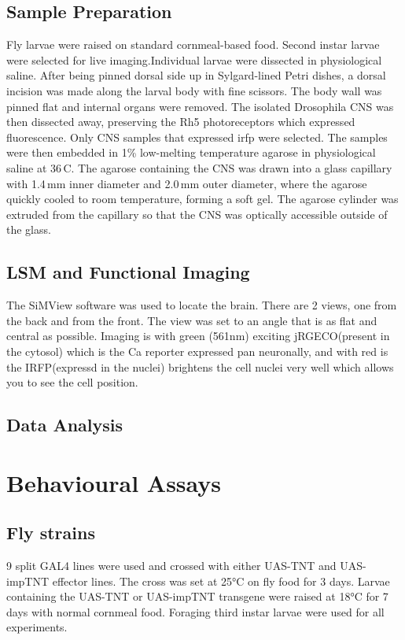 \subsection{Sample Preparation}
Fly larvae were raised on standard cornmeal-based food.
Second instar larvae were selected for live imaging.Individual larvae were dissected in physiological saline.
After being pinned dorsal side up in Sylgard-lined Petri dishes, a dorsal incision was made along the larval body with fine scissors. The body wall was pinned flat and internal organs were removed. The isolated Drosophila CNS was then dissected away, preserving the Rh5 photoreceptors which expressed fluorescence.  Only CNS samples that expressed irfp were selected.%
The samples were then embedded in 1\% low-melting temperature agarose in physiological saline at 36\,\textdegree C. The agarose containing the CNS was drawn into a glass capillary with 1.4\,mm inner diameter and 2.0\,mm outer diameter, where the agarose quickly cooled to room temperature, forming a soft gel. The agarose cylinder was extruded from the capillary so that the CNS was optically accessible outside of the glass. %


\subsection{LSM and Functional Imaging}
The SiMView software was used to locate the brain. There are 2 views, one from the back and from the front. The view was set to an angle that is as flat and central as possible. Imaging is with green (561nm) exciting jRGECO(present in the cytosol) which is the Ca reporter expressed pan neuronally, and with red is the IRFP(expressd in the nuclei) brightens the cell nuclei very well which allows you to see the cell position. 


\subsection{Data Analysis}



\section{Behavioural Assays}
\subsection{Fly strains}
9 split GAL4 lines were used and crossed with either UAS-TNT and UAS-impTNT effector lines.
The cross was set at 25°C on fly food for 3 days. Larvae containing the UAS-TNT or UAS-impTNT transgene were raised at 18°C for 7 days with normal cornmeal food. Foraging third instar larvae were used for all experiments. 

